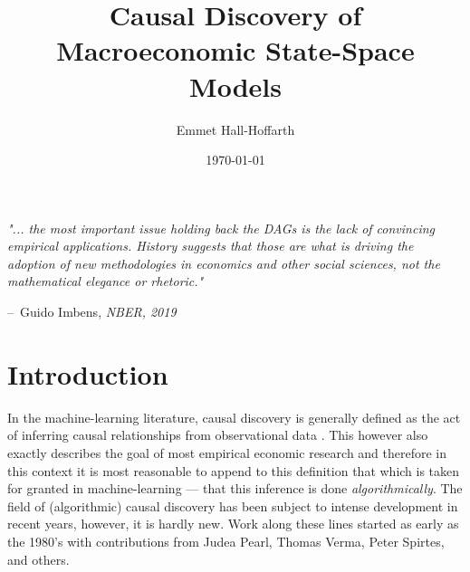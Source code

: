 \documentclass{article}
\title{Causal Discovery of Macroeconomic State-Space Models}
\author{Emmet Hall-Hoffarth}
\date{\today}
\makeatletter
\newenvironment{chapquote}[2][2em]
  {\setlength{\@tempdima}{#1}%
   \def\chapquote@author{#2}%
   \parshape 1 \@tempdima \dimexpr\textwidth-2\@tempdima\relax%
   \itshape}
  {\par\normalfont\hfill--\ \chapquote@author\hspace*{\@tempdima}\par\bigskip}
\makeatother
\begin{document}
\maketitle


\vspace{1cm}

\begin{chapquote}{Guido Imbens, \textit{NBER, 2019}}
  "... the most important issue holding back the DAGs is the lack of convincing empirical applications. History suggests that those are what is driving the adoption of new methodologies in economics and other social sciences,  not the mathematical elegance or rhetoric."
\end{chapquote}

\section{Introduction}

In the machine-learning literature, causal discovery is generally defined as the act of inferring causal relationships from observational data \parencite{huang2020causal}. This however also exactly describes the goal of most empirical economic research and therefore in this context it is most reasonable to append to this definition that which is taken for granted in machine-learning --- that this inference is done \textit{algorithmically}. The field of (algorithmic) causal discovery has been subject to intense development in recent years, however, it is hardly new. Work along these lines started as early as the 1980's with contributions from Judea Pearl, Thomas Verma, Peter Spirtes, and others. 
\end{document}
